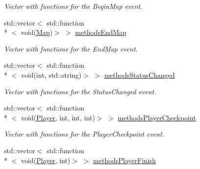 \begin{DoxyCompactItemize}
\begin{DoxyCompactList}\small\item\em Vector with functions for the Begin\-Map event. \end{DoxyCompactList}\item 
\hypertarget{classEventManager_abf91c3327317273584e1a60d8a68ca6e}{std\-::vector$<$ std\-::function\\*
$<$ void(\hyperlink{structMap}{Map})$>$ $>$ \hyperlink{classEventManager_abf91c3327317273584e1a60d8a68ca6e}{methods\-End\-Map}}\label{classEventManager_abf91c3327317273584e1a60d8a68ca6e}

\begin{DoxyCompactList}\small\item\em Vector with functions for the End\-Map event. \end{DoxyCompactList}\item 
\hypertarget{classEventManager_affc955af43afb14a3b950a3cd30b4972}{std\-::vector$<$ std\-::function\\*
$<$ void(int, std\-::string)$>$ $>$ \hyperlink{classEventManager_affc955af43afb14a3b950a3cd30b4972}{methods\-Status\-Changed}}\label{classEventManager_affc955af43afb14a3b950a3cd30b4972}

\begin{DoxyCompactList}\small\item\em Vector with functions for the Status\-Changed event. \end{DoxyCompactList}\item 
\hypertarget{classEventManager_aec8534b0e9229a761981003a749c8749}{std\-::vector$<$ std\-::function\\*
$<$ void(\hyperlink{structPlayer}{Player}, int, int, int)$>$ $>$ \hyperlink{classEventManager_aec8534b0e9229a761981003a749c8749}{methods\-Player\-Checkpoint}}\label{classEventManager_aec8534b0e9229a761981003a749c8749}

\begin{DoxyCompactList}\small\item\em Vector with functions for the Player\-Checkpoint event. \end{DoxyCompactList}\item 
\hypertarget{classEventManager_a3d205a716dd8f5c7380090c026c785db}{std\-::vector$<$ std\-::function\\*
$<$ void(\hyperlink{structPlayer}{Player}, int)$>$ $>$ \hyperlink{classEventManager_a3d205a716dd8f5c7380090c026c785db}{methods\-Player\-Finish}}\label{classEventManager_a3d205a716dd8f5c7380090c026c785db}


\end{DoxyCompactItemize}
